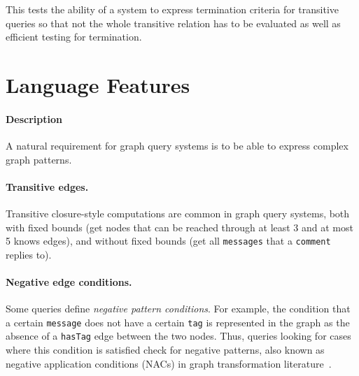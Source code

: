 



This tests the ability of a system to express termination criteria for transitive queries so that not the whole transitive relation has to be evaluated as well as efficient testing for termination.




\section{Language Features}




\paragraph{Description}

A natural requirement for graph query systems is to be able to express complex
graph patterns.

\paragraph{Transitive edges.} Transitive closure-style computations are common in graph query systems, both with fixed bounds
(\eg get nodes that can be reached through at least 3 and at most 5 \textsf{knows} edges),
and without fixed bounds
(\eg get all \texttt{messages} that a \texttt{comment} replies to).

\paragraph{Negative edge conditions.} Some queries define \emph{negative pattern conditions}. For example, the condition that a certain \texttt{message} does not have a certain \texttt{tag} is represented in the graph as the absence of a \texttt{hasTag} edge between the two nodes. Thus, queries looking for cases where this condition is satisfied check for negative patterns, also known as negative application conditions (NACs) in graph transformation literature~\cite{DBLP:journals/fuin/HabelHT96}.

